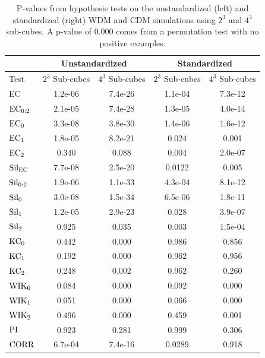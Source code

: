 \documentclass[12pt]{article}
\begin{document}
\begin{table}[htp!]
    \begin{center}
        \begin{tabular}{ l | c | c | c | c }
          \toprule
          \multicolumn{1}{c}{} & \multicolumn{2}{c}{Unstandardized} & \multicolumn{2}{c}{Standardized} \\
          \toprule
          Test & $2^3$ Sub-cubes & $4^3$ Sub-cubes & $2^3$ Sub-cubes & $4^3$ Sub-cubes \\
          \midrule
          EC & 1.2e-06 & 7.4e-26 & 1.1e-04 &  7.3e-12 \\
          $\textup{EC}_{0:2}$ & 2.1e-05 & 7.4e-28 & 1.3e-05 &  4.0e-14 \\
          $\textup{EC}_{0}$ & 3.3e-08 & 3.8e-30 & 1.4e-06 & 1.6e-12 \\
          $\textup{EC}_{1}$ &  1.8e-05 & 8.2e-21 & 0.024 & 0.001 \\
          $\textup{EC}_{2}$ & 0.340 & 0.088 & 0.004 & 2.0e-07 \\
          \midrule
          $\textup{Sil}_{\textup{EC}}$ & 7.7e-08 & 2.5e-20 & 0.0122 & 0.005 \\
          $\textup{Sil}_{0:2}$ & 1.9e-06 & 1.1e-33 & 4.3e-04 & 8.1e-12 \\
          $\textup{Sil}_{0}$ &3.0e-08 & 1.5e-34 & 6.5e-06 & 1.8e-11 \\
          $\textup{Sil}_{1}$ & 1.2e-05 & 2.9e-23 & 0.028 & 3.9e-07 \\
          $\textup{Sil}_{2}$ & 0.925 & 0.035 & 0.003 & 1.5e-04 \\
          \midrule
          $\textup{KC}_{0}$ & 0.442 & 0.000 & 0.986 & 0.856 \\
          $\textup{KC}_{1}$ & 0.192 & 0.000 & 0.962 & 0.956 \\
          $\textup{KC}_{2}$ & 0.248 & 0.002 & 0.962 & 0.260 \\
          \midrule
          $\textup{WIK}_{0}$ & 0.084 & 0.000 & 0.092 & 0.000 \\
          $\textup{WIK}_{1}$ & 0.051 & 0.000 & 0.066 & 0.000 \\
          $\textup{WIK}_{2}$ & 0.496 & 0.000 & 0.459 & 0.001 \\
          $\textup{PI}$ & 0.923 & 0.281 & 0.999 & 0.306 \\
          \midrule
          $\textup{CORR}$ & 6.7e-04 & 7.4e-16 & 0.0289 & 0.918 \\
          \bottomrule
        \end{tabular}
    \end{center}
\caption{P-values from hypothesis tests on the unstandardized (left) and standardized (right) WDM and CDM simulations using $2^3$ and $4^3$ sub-cubes. A p-value of $0.000$ comes from a permutation test with no positive examples. 
}
\label{table:hypoCDMWDMresults}
\end{table}
\end{document}

